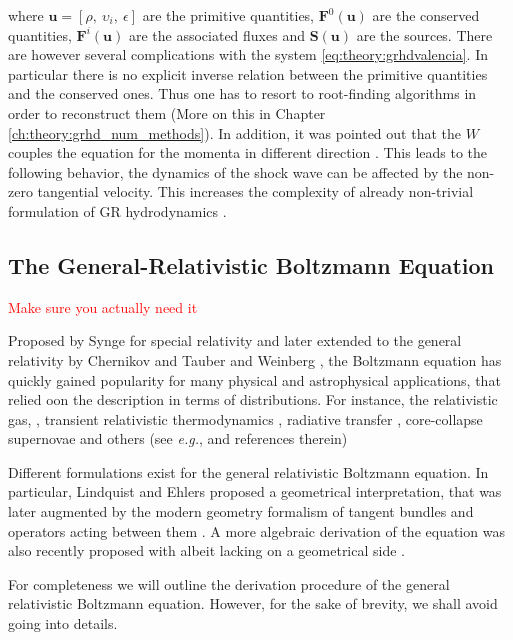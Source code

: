 \documentclass[11pt,a4paper,headinclude=true,DIV=14,BCOR=8mm,chapterprefix,listof=totoc,twoside,openright,abstracton]{scrbook}
\newcommand{\red}[1]{\textcolor{red}{#1}}
\begin{document}
where $\boldsymbol{u} = [\rho,\: \upsilon_i,\: \epsilon]$ are the primitive quantities, $\boldsymbol{F}^0(\boldsymbol{u})$ are the conserved quantities, $\boldsymbol{F}^i(\boldsymbol{u})$ are the associated fluxes and $\boldsymbol{S}(\boldsymbol{u})$ are the sources. 
There are however several complications with the system \ref{eq:theory:grhdvalencia}. In particular there is no explicit inverse relation between the primitive quantities and the conserved ones. Thus one has to resort to root-finding algorithms in order to reconstruct them (More on this in Chapter \ref{ch:theory:grhd_num_methods}). In addition, it was pointed out that the $W$ couples the equation for the momenta in different direction \cite{Pons:2000,Rezzolla:2002ra,Rezzolla:2002cc,Aloy:2006rd}. This leads to the following behavior, the dynamics of the shock wave can be affected by the non-zero tangential velocity. This increases the complexity of already non-trivial formulation of GR hydrodynamics \cite{Mignone:2005ns,Zhang:2005qy}.


\subsection{The General-Relativistic Boltzmann Equation}
\red{Make sure you actually need it}

Proposed by Synge \cite{Synge:1957} for special relativity and later extended to the general relativity by Chernikov \cite{Chernikov:1962} and Tauber and Weinberg \cite{Tauber:1961}, the Boltzmann equation has quickly gained popularity for many physical and astrophysical applications, that relied oon the description in terms of distributions. For instance, the relativistic gas, \cite{Israel:1963}, transient relativistic thermodynamics \cite{Israel:1979wp}, radiative transfer \cite{Lindquist:1966}, core-collapse supernovae \cite{Bruenn:1985} and others (see \textit{e.g.}, \cite{Cercignani:2002} and references therein)

Different formulations exist for the general relativistic Boltzmann equation. In particular, Lindquist \cite{Lindquist:1966} and Ehlers \cite{Ehlers:1971} proposed a geometrical interpretation, that was later augmented by the modern geometry formalism of tangent bundles and operators acting between them \cite{Sasaki:1958,Sasaki:1962}. A more algebraic derivation of the equation was also recently proposed with albeit lacking on a geometrical side \cite{Debbasch:2009a,Debbasch:2009b}. 

For completeness we will outline the derivation procedure of the general relativistic Boltzmann equation. However, for the sake of brevity, we shall avoid going into details.
\end{document}
